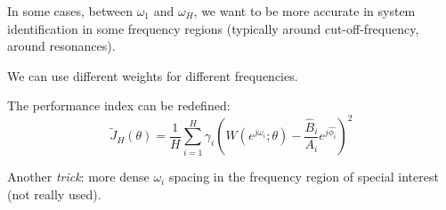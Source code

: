 
\begin{remark}
    In some cases, between $\omega_1$ and $\omega_H$, we want to be more accurate in system identification in some frequency regions (typically around cut-off-frequency, around resonances).

    We can use different weights for different frequencies.

    \begin{figure}[H]
        \centering
    \end{figure}

    The performance index can be redefined:
    \[
        \tilde{J}_H (\theta) = \frac{1}{H} \sum_{i=1}^H \gamma_i \left(W(e^{j\omega_i};\theta) - \frac{\hat{B}_i}{A_i}e^{j\hat{\phi_i}}\right)^2
    \]

    Another \emph{trick}: more dense $\omega_i$ spacing in the frequency region of special interest (not really used).
\end{remark}

